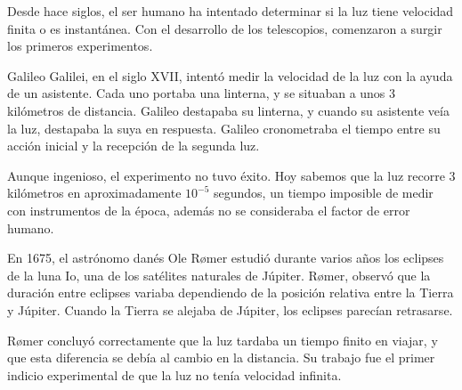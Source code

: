\vspace{0.3cm}


Desde hace siglos, el ser humano ha intentado determinar si la luz tiene velocidad finita o es instantánea. Con el desarrollo de los telescopios, comenzaron a surgir los primeros experimentos.


Galileo Galilei, en el siglo XVII, intentó medir la velocidad de la luz con la ayuda de un asistente. Cada uno portaba una linterna, y se situaban a unos 3 kilómetros de distancia. Galileo destapaba su linterna, y cuando su asistente veía la luz, destapaba la suya en respuesta. Galileo cronometraba el tiempo entre su acción inicial y la recepción de la segunda luz.

Aunque ingenioso, el experimento no tuvo éxito. Hoy sabemos que la luz recorre 3 kilómetros en aproximadamente $10^{-5}$ segundos, un tiempo imposible de medir con instrumentos de la época, además no se consideraba el factor de error humano.


\vspace{0.3cm}


En 1675, el astrónomo danés Ole Rømer estudió durante varios años los eclipses de la luna Io, una de los satélites naturales de Júpiter. Rømer, observó que la duración entre eclipses variaba dependiendo de la posición relativa entre la Tierra y Júpiter. Cuando la Tierra se alejaba de Júpiter, los eclipses parecían retrasarse.

Rømer concluyó correctamente que la luz tardaba un tiempo finito en viajar, y que esta diferencia se debía al cambio en la distancia. Su trabajo fue el primer indicio experimental de que la luz no tenía velocidad infinita.

